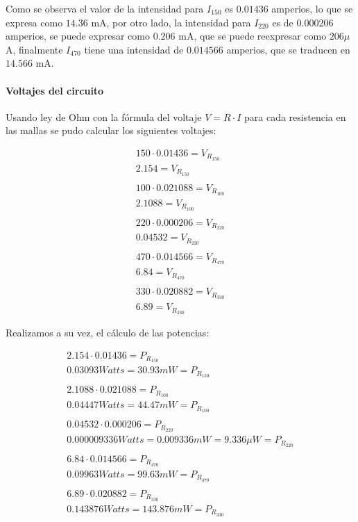 \documentclass[conference]{IEEEtran}
\begin{document}
Como se observa el valor de la intensidad para $I_{150}$ es $0.01436$ amperios, lo 
que se expresa como $14.36$ mA, por otro lado, la intensidad para $I_{220}$ es de 
$0.000206$ amperios, se puede expresar como $0.206$ mA, que se puede reexpresar 
como $206 \mu$A, finalmente $I_{470}$ tiene una intensidad de $0.014566$ amperios, 
que se traducen en $14.566$ mA.

\paragraph{Voltajes del circuito}

Usando ley de Ohm con la fórmula del voltaje $V = R \cdot I$ para cada
resistencia en las mallas se pudo calcular los siguientes voltajes:

\begin{align*}
  150 \cdot 0.01436 = V_{R_{150}} \\
  2.154 = V_{R_{150}} \\ \\
  100 \cdot 0.021088 = V_{R_{100}} \\
  2.1088 = V_{R_{100}} \\ \\
  220 \cdot 0.000206 = V_{R_{220}} \\
  0.04532 = V_{R_{220}} \\ \\
  470 \cdot 0.014566 = V_{R_{470}} \\
  6.84 = V_{R_{470}} \\ \\
  330 \cdot 0.020882 = V_{R_{330}} \\
  6.89 = V_{R_{330}}
\end{align*}

Realizamos a su vez, el cálculo de las potencias:

\begin{align*}
  2.154 \cdot 0.01436 = P_{R_{150}} \\
  0.03093 Watts = 30.93 mW = P_{R_{150}} \\ \\
  2.1088 \cdot 0.021088 = P_{R_{100}} \\
  0.04447 Watts = 44.47 mW = P_{R_{100}} \\ \\
  0.04532 \cdot 0.000206 = P_{R_{220}} \\
  0.000009336 Watts = 0.009336 mW = 9.336 \mu W = P_{R_{220}} \\ \\
  6.84 \cdot 0.014566 = P_{R_{470}} \\
  0.09963 Watts = 99.63 mW = P_{R_{470}} \\ \\
  6.89 \cdot 0.020882 = P_{R_{330}} \\
  0.143876 Watts = 143.876 mW = P_{R_{330}}
\end{align*}
\end{document}
